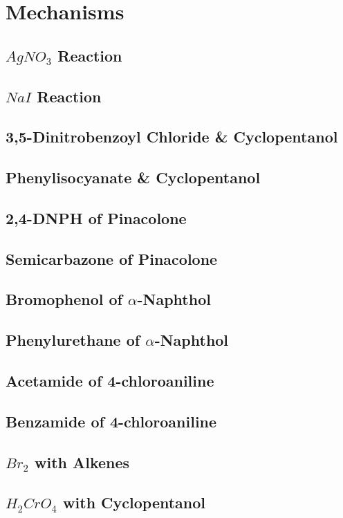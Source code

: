 \documentclass{article}
\begin{document}
	\section{Mechanisms}
	\subsection{$AgNO_3$ Reaction}
	\subsection{$NaI$ Reaction}
	\subsection{3,5-Dinitrobenzoyl Chloride \& Cyclopentanol}
	\subsection{Phenylisocyanate \& Cyclopentanol}
	\subsection{2,4-DNPH of Pinacolone}
	\subsection{Semicarbazone of Pinacolone}
	\subsection{Bromophenol of $\alpha$-Naphthol}
	\subsection{Phenylurethane of $\alpha$-Naphthol}
	\subsection{Acetamide of 4-chloroaniline}
	\subsection{Benzamide of 4-chloroaniline}
	\subsection{$Br_2$ with Alkenes}
	\subsection{$H_2CrO_4$ with Cyclopentanol}
\end{document}
